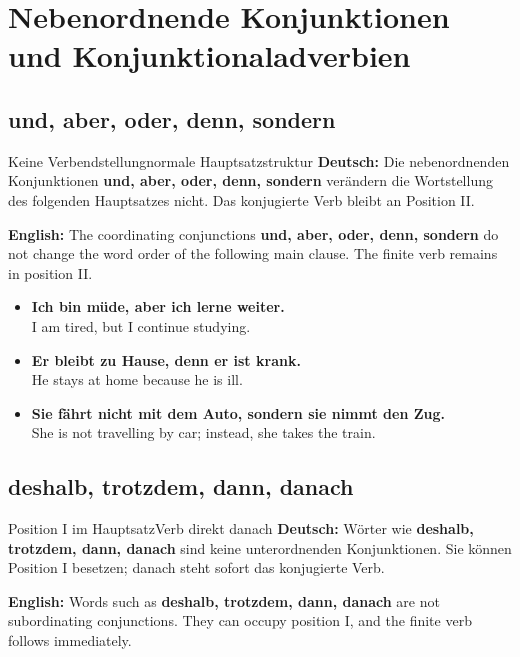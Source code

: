 \documentclass[a4paper,11pt]{article}
\newcommand{\GermanText}[1]{\textbf{Deutsch: }#1\par}
\newcommand{\EnglishText}[1]{{\small\color{SoftGray}\textbf{English: }#1\par}}
\newcommand{\ExampleItem}[2]{\item \textbf{#1}\\{\small\color{SoftGray}#2}}
\begin{document}
    
    \section{Nebenordnende Konjunktionen und Konjunktionaladverbien}
        
        \subsection{und, aber, oder, denn, sondern}
            
            \begin{grammarentry}{Keine Verbendstellung}{normale Hauptsatzstruktur}
                \GermanText{Die nebenordnenden Konjunktionen \textbf{und, aber, oder, denn, sondern} verändern die Wortstellung des folgenden Hauptsatzes nicht. Das konjugierte Verb bleibt an Position II.}
                \EnglishText{The coordinating conjunctions \textbf{und, aber, oder, denn, sondern} do not change the word order of the following main clause. The finite verb remains in position II.}
            \end{grammarentry}
            
            \begin{exbox}
                \begin{itemize}
                    \ExampleItem{Ich bin müde, aber ich lerne weiter.}{I am tired, but I continue studying.}
                    \ExampleItem{Er bleibt zu Hause, denn er ist krank.}{He stays at home because he is ill.}
                    \ExampleItem{Sie fährt nicht mit dem Auto, sondern sie nimmt den Zug.}{She is not travelling by car; instead, she takes the train.}
                \end{itemize}
            \end{exbox}
        
        \subsection{deshalb, trotzdem, dann, danach}
            
            \begin{grammarentry}{Position I im Hauptsatz}{Verb direkt danach}
                \GermanText{Wörter wie \textbf{deshalb, trotzdem, dann, danach} sind keine unterordnenden Konjunktionen. Sie können Position I besetzen; danach steht sofort das konjugierte Verb.}
                \EnglishText{Words such as \textbf{deshalb, trotzdem, dann, danach} are not subordinating conjunctions. They can occupy position I, and the finite verb follows immediately.}
            \end{grammarentry}
            
\end{document}
